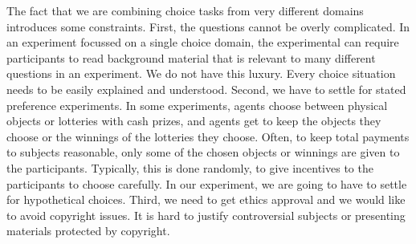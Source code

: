 \documentclass[11pt,letter]{amsart}
\begin{document}
The fact that we are combining choice tasks from very different domains introduces some constraints.
First, the questions cannot be overly complicated.
In an experiment focussed on a single choice domain, the experimental can require participants to read  background material that is relevant to many different questions in an experiment.
We do not have this luxury.
Every choice situation needs to be easily explained and understood.
Second, we have to settle for stated preference experiments.
In some experiments, agents choose between physical objects or lotteries with cash prizes, and agents get to keep the objects they choose or the winnings of the lotteries they choose.
Often, to keep total payments to subjects reasonable, only some of the chosen objects or winnings are given to the participants.
Typically, this is done randomly, to give incentives to the participants to choose carefully.
In our experiment, we are going to have to settle for hypothetical choices.
Third, we need to get ethics approval and we would like to avoid copyright issues.
It is hard to justify controversial subjects or presenting materials protected by copyright.




\end{document}
